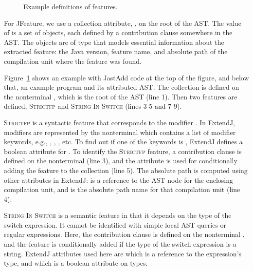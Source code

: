 \begin{figure}
\caption{\label{fig:featureExample}Example definitions of features.}
\end{figure}

For JFeature, we use a collection attribute, , on the root of the AST.
The value of  is a set of objects, each defined by a contribution clause somewhere in the AST.
The objects are of type  that
models essential information about the extracted feature: the Java version, feature name, and absolute path of the compilation unit where the feature was found.

Figure~\ref{fig:featureExample} shows an example with JastAdd code at the top of the figure, and below that, an example program and its attributed AST.
The  collection is defined on the nonterminal , which is the root of the AST (line 1). Then two features are defined, \textsc{Strictfp} and \textsc{String In Switch} (lines 3-5 and 7-9).

\textsc{Strictfp} is a syntactic feature that corresponds to the modifier .
In ExtendJ, modifiers are represented by the nonterminal  which contains a list of modifier keywords, e.g., , , , etc.
To find out if one of the keywords is , ExtendJ defines a boolean attribute  for .
To identify the \textsc{Strictfp} feature, a contribution clause is defined on the nonterminal  (line 3), and the  attribute is used for conditionally adding the feature to the collection (line 5).
The absolute path is computed using other attributes in ExtendJ:  is a reference to the AST node for the enclosing compilation unit, and  is the absolute path name for that compilation unit (line 4).

\textsc{String In Switch} is a semantic feature in that it depends on the type of the switch expression. It cannot be identified with simple local AST queries or regular expressions. Here, the contribution clause is defined on the nonterminal , and the feature is conditionally added if the type of the switch expression is a string. ExtendJ attributes used here are  which is a reference to the expression's type, and  which is a boolean attribute on types.





